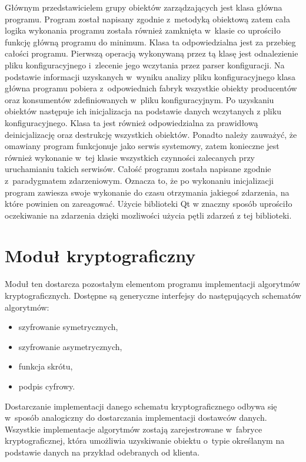 Głównym przedstawicielem grupy obiektów zarządzających jest klasa
główna programu. Program został napisany zgodnie z~metodyką obiektową
zatem cała logika wykonania programu została również zamknięta
w~klasie co uprościło funkcję główną programu do minimum. Klasa ta
odpowiedzialna jest za przebieg całości programu. Pierwszą operacją
wykonywaną przez tą klasę jest odnalezienie pliku konfiguracyjnego
i~zlecenie jego wczytania przez parser konfiguracji. Na podstawie
informacji uzyskanych w~wyniku analizy pliku konfiguracyjnego klasa
główna programu pobiera z~odpowiednich fabryk wszystkie obiekty
producentów oraz konsumentów zdefiniowanych w~pliku
konfiguracyjnym. Po uzyskaniu obiektów następuje ich inicjalizacja na
podstawie danych wczytanych z pliku konfiguracyjnego. Klasa ta jest
również odpowiedzialna za prawidłową deinicjalizację oraz destrukcję
wszystkich obiektów. Ponadto należy zauważyć, że omawiany program
funkcjonuje jako serwis systemowy, zatem konieczne jest również
wykonanie w~tej klasie wszystkich czynności zalecanych przy
uruchamianiu takich serwisów. Całość programu została napisane zgodnie
z~paradygmatem zdarzeniowym. Oznacza to, że po wykonaniu inicjalizacji
program zawiesza swoje wykonanie do czasu otrzymania jakiegoś
zdarzenia, na które powinien on zareagować. Użycie biblioteki Qt w
znaczny sposób uprościło oczekiwanie na zdarzenia dzięki mozliwości
użycia pętli zdarzeń z tej biblioteki.

\section[Moduł kryptograficzny][Moduł kryptograficzny]{Moduł kryptograficzny}

Moduł ten dostarcza pozostałym elementom programu implementacji
algorytmów kryptograficznych. Dostępne są generyczne interfejsy do
następujących schematów algorytmów:

\begin{itemize}
\item szyfrowanie symetrycznych,
\item szyfrowanie asymetrycznych,
\item funkcja skrótu,
\item podpis cyfrowy.
\end{itemize}

Dostarczanie implementacji danego schematu kryptograficznego odbywa
się w~sposób analogiczny do dostarczania implementacji dostawców
danych. Wszystkie implementacje algorytmów zostają zarejestrowane
w~fabryce kryptograficznej, która umożliwia uzyskiwanie obiektu
o~typie określanym na podstawie danych na przykład odebranych od
klienta.

